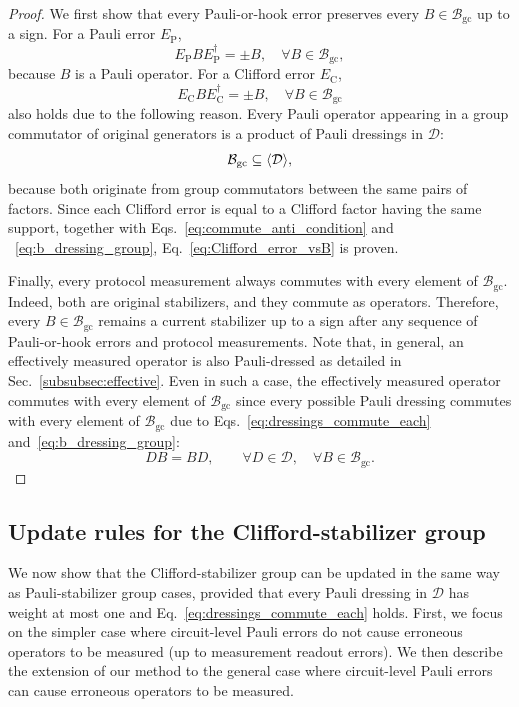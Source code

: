 \documentclass[
 reprint,
 amsmath,amssymb,
 pra,superscriptaddress, nofootinbib
]{revtex4-2}
\theoremstyle{definition}
\theoremstyle{plain}
\begin{document}
\begin{proof}
We first show that every Pauli-or-hook error preserves every
$B\in\mathcal{B}_{\mathrm{gc}}$ up to a sign. For a Pauli error
$E_{\mathrm P}$,
\begin{equation}
  E_\mathrm{P} B E_\mathrm{P}^\dagger= \pm B,
  \quad \forall B\in\mathcal{B}_{\mathrm{gc}},
\end{equation}
because $B$ is a Pauli operator.
For a Clifford error $E_\mathrm{C}$,
\begin{equation}
  \label{eq:Clifford_error_vsB}
  E_\mathrm{C} B E_\mathrm{C}^\dagger= \pm B,
  \quad \forall B\in\mathcal{B}_{\mathrm{gc}}
\end{equation}
also holds due to the following reason.
Every Pauli operator appearing in a group commutator of original generators is a product of Pauli dressings in $\mathcal{D}$:
\begin{equation}
\mathcal B_{\rm gc}\subseteq \langle\mathcal D\rangle,
\label{eq:b_dressing_group}
\end{equation}
because both originate from group commutators between the same pairs of factors.
Since each Clifford error is equal to a Clifford factor having the same support, together with Eqs.~\eqref{eq:commute_anti_condition} and ~\eqref{eq:b_dressing_group}, Eq.~\eqref{eq:Clifford_error_vsB} is proven.

Finally, every protocol measurement always commutes with every element of $\mathcal{B}_{\mathrm{gc}}$.
Indeed, both are original stabilizers, and they commute as operators.
Therefore, every $B\in\mathcal{B}_{\mathrm{gc}}$ remains a current stabilizer up to a sign after any sequence of Pauli-or-hook errors and protocol measurements.
Note that, in general, an effectively measured operator is also Pauli-dressed as detailed in Sec.~\ref{subsubsec:effective}. Even in such a case, the effectively measured operator commutes with every element of $\mathcal{B}_{\mathrm{gc}}$ since every possible Pauli dressing commutes with every element of $\mathcal{B}_{\mathrm{gc}}$ due to Eqs.~\eqref{eq:dressings_commute_each} and~\eqref{eq:b_dressing_group}:
\begin{equation}
  DB=BD, \qquad \forall  D\in\mathcal{D},\quad \forall B\in\mathcal{B}_{\mathrm{gc}}.
  \label{eq:dressing_commutes_with_B}
\end{equation}
\end{proof}

\subsection{Update rules for the Clifford-stabilizer group}
We now show that the Clifford-stabilizer group can be updated in the same way as Pauli-stabilizer group cases, provided that every Pauli dressing in $\mathcal{D}$ has weight at most one and Eq.~\eqref{eq:dressings_commute_each} holds. 
First, we focus on the simpler case where circuit-level Pauli errors do not cause erroneous operators to be measured (up to measurement readout errors). 
We then describe the extension of our method to the general case where circuit-level Pauli errors can cause erroneous operators to be measured. 
\end{document}
